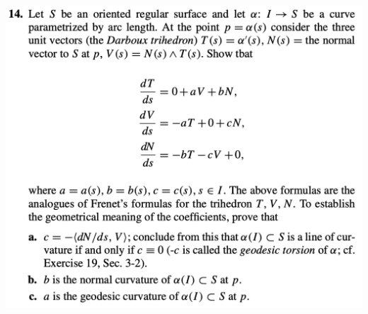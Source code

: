 \documentclass{report}
\begin{document}
\begin{question}{}{}
\includegraphics[height=15cm,width=18cm]{hw75}
\end{question}
\end{document}
